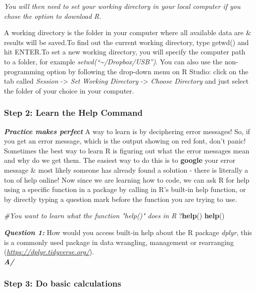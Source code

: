 \documentclass[]{article}
\newenvironment{Shaded}{\begin{snugshade}}{\end{snugshade}}
\newcommand{\CommentTok}[1]{\textcolor[rgb]{0.56,0.35,0.01}{\textit{#1}}}
\newcommand{\KeywordTok}[1]{\textcolor[rgb]{0.13,0.29,0.53}{\textbf{#1}}}
\newcommand{\NormalTok}[1]{#1}
\begin{document}
\emph{You will then need to set your working directory in your local
computer if you chose the option to download R.}

A working directory is the folder in your computer where all available
data are \& results will be saved.To find out the current working
directory, type getwd() and hit ENTER.To set a new working directory,
you will specify the computer path to a folder, for example
\emph{setwd(``\textasciitilde{}/Dropbox/USB'')}. You can also use the
non-programming option by following the drop-down menu on R Studio:
click on the tab called \emph{Session} -\textgreater{} \emph{Set Working
Directory} -\textgreater{} \emph{Choose Directory} and just select the
folder of your choice in your computer.

\hypertarget{step-2-learn-the-help-command}{%
\subsubsection{Step 2: Learn the Help
Command}\label{step-2-learn-the-help-command}}

\textbf{\emph{Practice makes perfect}} A way to learn is by deciphering
error messages! So, if you get an error message, which is the output
showing on red font, don't panic! Sometimes the best way to learn R is
figuring out what the error messages mean and why do we get them. The
easiest way to do this is to \textbf{google} your error message \& most
likely someone has already found a solution - there is literally a ton
of help online! Now since we are learning how to code, we can ask R for
help using a specific function in a package by calling in R's built-in
help function, or by directly typing a question mark before the function
you are trying to use.

\begin{Shaded}
\begin{Highlighting}[]
\CommentTok{#You want to learn what the function "help()" does in R}
\NormalTok{?}\KeywordTok{help}\NormalTok{()}
\KeywordTok{help}\NormalTok{() }
\end{Highlighting}
\end{Shaded}

\textbf{\emph{Question 1:}} How would you access built-in help about the
R package \emph{dplyr}, this is a commonly used package in data
wrangling, management or rearranging
(\emph{\url{https://dplyr.tidyverse.org/}}).\\
\textbf{\emph{A/}}

\hypertarget{step-3-do-basic-calculations}{%
\subsubsection{Step 3: Do basic
calculations}\label{step-3-do-basic-calculations}}
\end{document}
